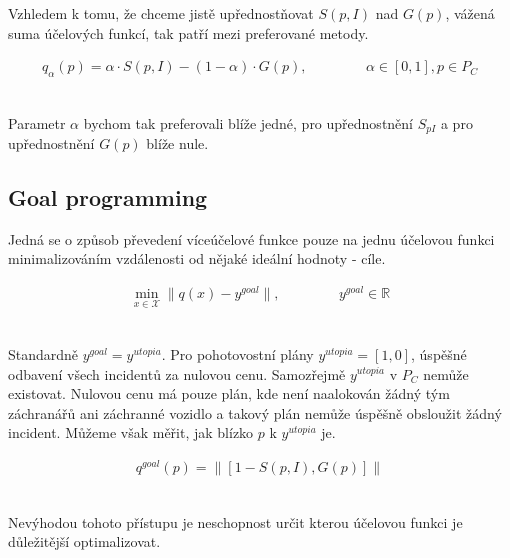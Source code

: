 Vzhledem k tomu, že chceme jistě upřednostňovat $S(p, I)$ nad $G(p)$, vážená suma účelových funkcí, tak patří mezi preferované metody.

\begin{definice}
  \begin{align}
    q_{\alpha}(p) = \alpha \cdot S(p, I) - (1 - \alpha) \cdot G(p), \hspace{50pt} \alpha \in [0, 1], p \in P_C
  \end{align}
  \\
\end{definice}

Parametr $\alpha$ bychom tak preferovali blíže jedné, pro upřednostnění $S_{pI}$ a pro upřednostnění $G(p)$ blíže nule.

\subsection{Goal programming}

Jedná se o způsob převedení víceúčelové funkce pouze na jednu účelovou funkci minimalizováním vzdálenosti od nějaké ideální hodnoty - cíle. 

\begin{definice}
  \begin{align}
    \min_{x \in \mathcal{X}} \| q(x) - y^{goal} \|, \hspace{50pt} y^{goal} \in \mathbb{R}
  \end{align}
  \\
\end{definice}

Standardně $y^{goal} = y^{utopia}$.
Pro pohotovostní plány $y^{utopia} = [1, 0]$, úspěšné odbavení všech incidentů za nulovou cenu.
Samozřejmě $y^{utopia}$ v $P_C$ nemůže existovat.
Nulovou cenu má pouze plán, kde není naalokován žádný tým záchranářů ani záchranné vozidlo a takový plán nemůže úspěšně obsloužit žádný incident. 
Můžeme však měřit, jak blízko $p$ k $y^{utopia}$ je.

\begin{definice}
  \begin{align}
    q^{goal}(p) = \| [1 - S(p, I), G(p)] \|
  \end{align}
  \\
\end{definice}

Nevýhodou tohoto přístupu je neschopnost určit kterou účelovou funkci je důležitější optimalizovat.

